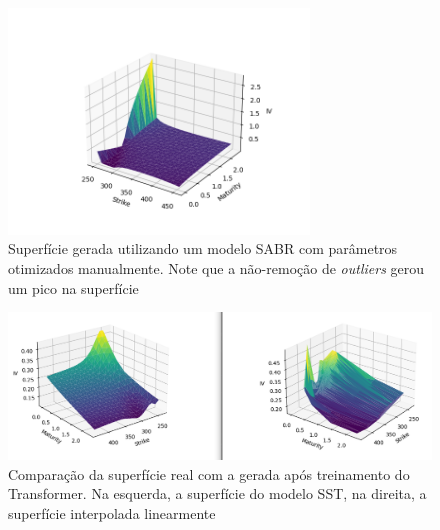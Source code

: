 \begin{figure}
	\begin{center}
		\includegraphics[width=8cm]{resources/pred_surface.png}
		\caption{Superfície gerada utilizando um modelo SABR com parâmetros otimizados manualmente. Note que a não-remoção de \textit{outliers} gerou um pico na superfície}
	\end{center}
\end{figure}

\begin{figure}
	\begin{center}
		\includegraphics[width=16cm]{resources/sst.png}
		\caption{Comparação da superfície real com a gerada após treinamento do Transformer. Na esquerda, a superfície do modelo SST, na direita, a superfície interpolada linearmente}
	\end{center}
\end{figure}
	
